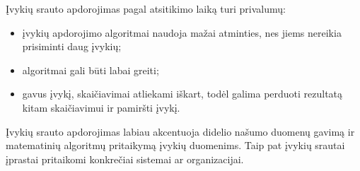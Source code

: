 Įvykių srauto apdorojimas pagal atsitikimo laiką turi privalumų:

\begin{itemize}

	\item įvykių apdorojimo algoritmai naudoja mažai atminties, nes jiems nereikia prisiminti daug įvykių;

	\item algoritmai gali būti labai greiti;

	\item gavus įvykį, skaičiavimai atliekami iškart, todėl galima perduoti rezultatą kitam skaičiavimui ir pamiršti įvykį.

\end{itemize}

Įvykių srauto apdorojimas labiau akcentuoja didelio našumo duomenų gavimą ir matematinių algoritmų pritaikymą įvykių duomenims. Taip pat įvykių srautai įprastai pritaikomi konkrečiai sistemai ar organizacijai.
